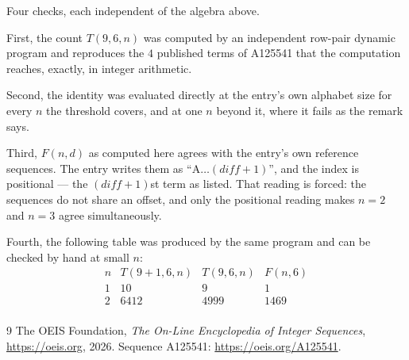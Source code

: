 \documentclass[11pt,a4paper]{article}
\theoremstyle{plain}
\theoremstyle{definition}
\begin{document}
Four checks, each independent of the algebra above.

First, the count $T(9,6,n)$ was computed by an independent row-pair dynamic program and
reproduces the $4$ published terms of A125541 that the computation reaches,
exactly, in integer arithmetic.

Second, the identity was evaluated directly at the entry's own alphabet size for every $n$ the
threshold covers, and at one $n$ beyond it, where it fails as the remark says.

Third, $F(n,d)$ as computed here agrees with the entry's own reference sequences. The entry
writes them as ``$\mathrm{A}\dots(\mathit{diff}+1)$'', and the index is positional --- the
$(\mathit{diff}+1)$st term as listed. That reading is forced: the sequences do not share an
offset, and only the positional reading makes $n=2$ and $n=3$ agree simultaneously.

Fourth, the following table was produced by the same program and can be checked by hand at
small $n$:
\[
\begin{array}{rrrr}
n & T(9+1,6,n) & T(9,6,n) & F(n,6) \\ \hline
1 & 10 & 9 & 1 \\
2 & 6412 & 4999 & 1469 \\
\end{array}
\]

\begin{thebibliography}{9}
 The OEIS Foundation, \emph{The On-Line Encyclopedia of Integer Sequences},
\url{https://oeis.org}, 2026. Sequence A125541: \url{https://oeis.org/A125541}.
\end{thebibliography}
\end{document}
